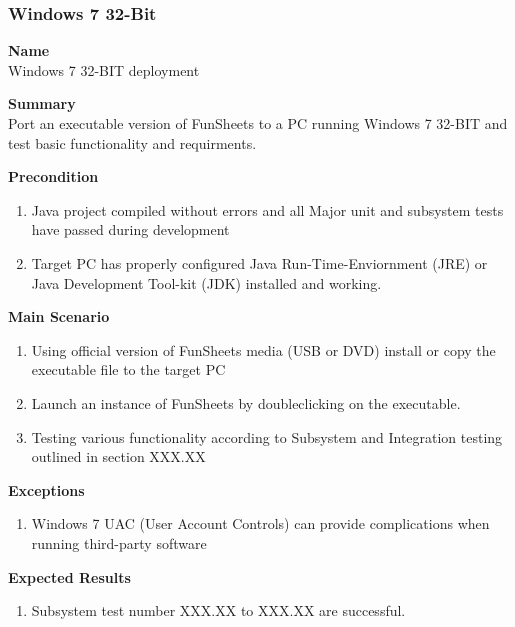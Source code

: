 \documentclass[12pt]{article}
\begin{document}
\clearpage
\subsubsection{Windows 7 32-Bit} \label{uc:1}

\noindent
{\bf Name}\\
Windows 7 32-BIT deployment

\noindent
{\bf Summary}\\
Port an executable version of FunSheets to a PC running Windows 7 32-BIT and test basic functionality and requirments.

\noindent
{\bf Precondition}\\
\begin{enumerate}
\item Java project compiled without errors and all Major unit and subsystem tests have passed during development
\item Target PC has properly configured Java Run-Time-Enviornment (JRE) or Java Development Tool-kit (JDK) installed and working.
\end{enumerate}

\noindent
{\bf Main Scenario}\
\vspace*{-0.2in}
\begin{enumerate}
\item Using official version of FunSheets media (USB or DVD) install or copy the executable file to the target PC
\item Launch an instance of FunSheets by doubleclicking on the executable.
\item Testing various functionality according to Subsystem and Integration testing outlined in section XXX.XX
\end{enumerate}

{\bf Exceptions}\
\begin{enumerate}
\item Windows 7 UAC (User Account Controls) can provide complications when running third-party software
\end{enumerate}
{\bf Expected Results}\
\begin{enumerate}
\item Subsystem test number XXX.XX to XXX.XX are successful.
\end{enumerate}
\end{document}
